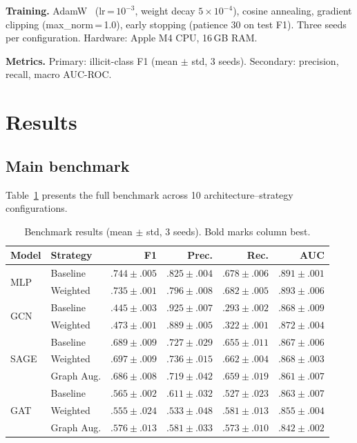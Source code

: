 \documentclass[11pt]{article}
\begin{document}
\textbf{Training.}  AdamW~\citep{loshchilov2019adamw}
(lr\,=\,$10^{-3}$, weight decay $5{\times}10^{-4}$), cosine
annealing, gradient clipping (max\_norm\,=\,1.0), early stopping
(patience 30 on test F1).  Three seeds per configuration.
Hardware: Apple M4 CPU, 16\,GB RAM.

\textbf{Metrics.}  Primary: illicit-class F1 (mean $\pm$ std, 3
seeds).  Secondary: precision, recall, macro AUC-ROC.

\section{Results}
\label{sec:experiments}

\subsection{Main benchmark}

Table~\ref{tab:main_results} presents the full benchmark across 10
architecture--strategy configurations.

\begin{table}[t]
\centering
\small
\caption{Benchmark results (mean $\pm$ std, 3 seeds).  Bold marks
column best.}
\label{tab:main_results}
\begin{tabular}{llrrrr}
\toprule
\textbf{Model} & \textbf{Strategy} & \textbf{F1} & \textbf{Prec.}
  & \textbf{Rec.} & \textbf{AUC} \\
\midrule
\multirow{2}{*}{MLP}
  & Baseline & $\mathbf{.744\!\pm\!.005}$ & $\mathbf{.825\!\pm\!.004}$
    & $.678\!\pm\!.006$ & $.891\!\pm\!.001$ \\
  & Weighted & $.735\!\pm\!.001$ & $.796\!\pm\!.008$
    & $.682\!\pm\!.005$ & $\mathbf{.893\!\pm\!.006}$ \\
\midrule
\multirow{2}{*}{GCN}
  & Baseline & $.445\!\pm\!.003$ & $.925\!\pm\!.007$
    & $.293\!\pm\!.002$ & $.868\!\pm\!.009$ \\
  & Weighted & $.473\!\pm\!.001$ & $.889\!\pm\!.005$
    & $.322\!\pm\!.001$ & $.872\!\pm\!.004$ \\
\midrule
\multirow{3}{*}{SAGE}
  & Baseline & $.689\!\pm\!.009$ & $.727\!\pm\!.029$
    & $.655\!\pm\!.011$ & $.867\!\pm\!.006$ \\
  & Weighted & $.697\!\pm\!.009$ & $.736\!\pm\!.015$
    & $.662\!\pm\!.004$ & $.868\!\pm\!.003$ \\
  & Graph Aug. & $.686\!\pm\!.008$ & $.719\!\pm\!.042$
    & $.659\!\pm\!.019$ & $.861\!\pm\!.007$ \\
\midrule
\multirow{3}{*}{GAT}
  & Baseline & $.565\!\pm\!.002$ & $.611\!\pm\!.032$
    & $.527\!\pm\!.023$ & $.863\!\pm\!.007$ \\
  & Weighted & $.555\!\pm\!.024$ & $.533\!\pm\!.048$
    & $\mathbf{.581\!\pm\!.013}$ & $.855\!\pm\!.004$ \\
  & Graph Aug. & $.576\!\pm\!.013$ & $.581\!\pm\!.033$
    & $.573\!\pm\!.010$ & $.842\!\pm\!.002$ \\
\bottomrule
\end{tabular}
\end{table}
\end{document}
